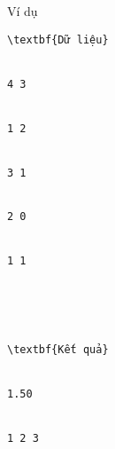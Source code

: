 Ví dụ
\begin{verbatim}
\textbf{Dữ liệu}


4 3


1 2


3 1


2 0


1 1





\textbf{Kết quả}


1.50


1 2 3


\end{verbatim}